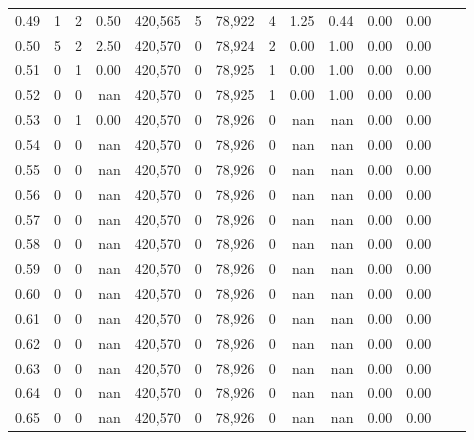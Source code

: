 \begin{tabular}{rrrrrrrrrrrrrr}
0.49 &       1 &      2 &    0.50 &  420,565 &        5 &  78,922 &       4 &  1.25 &  0.44 &  0.00 &      0.00 \\
0.50 &       5 &      2 &    2.50 &  420,570 &        0 &  78,924 &       2 &  0.00 &  1.00 &  0.00 &      0.00 \\
0.51 &       0 &      1 &    0.00 &  420,570 &        0 &  78,925 &       1 &  0.00 &  1.00 &  0.00 &      0.00 \\
0.52 &       0 &      0 &     nan &  420,570 &        0 &  78,925 &       1 &  0.00 &  1.00 &  0.00 &      0.00 \\
0.53 &       0 &      1 &    0.00 &  420,570 &        0 &  78,926 &       0 &   nan &   nan &  0.00 &      0.00 \\
0.54 &       0 &      0 &     nan &  420,570 &        0 &  78,926 &       0 &   nan &   nan &  0.00 &      0.00 \\
0.55 &       0 &      0 &     nan &  420,570 &        0 &  78,926 &       0 &   nan &   nan &  0.00 &      0.00 \\
0.56 &       0 &      0 &     nan &  420,570 &        0 &  78,926 &       0 &   nan &   nan &  0.00 &      0.00 \\
0.57 &       0 &      0 &     nan &  420,570 &        0 &  78,926 &       0 &   nan &   nan &  0.00 &      0.00 \\
0.58 &       0 &      0 &     nan &  420,570 &        0 &  78,926 &       0 &   nan &   nan &  0.00 &      0.00 \\
0.59 &       0 &      0 &     nan &  420,570 &        0 &  78,926 &       0 &   nan &   nan &  0.00 &      0.00 \\
0.60 &       0 &      0 &     nan &  420,570 &        0 &  78,926 &       0 &   nan &   nan &  0.00 &      0.00 \\
0.61 &       0 &      0 &     nan &  420,570 &        0 &  78,926 &       0 &   nan &   nan &  0.00 &      0.00 \\
0.62 &       0 &      0 &     nan &  420,570 &        0 &  78,926 &       0 &   nan &   nan &  0.00 &      0.00 \\
0.63 &       0 &      0 &     nan &  420,570 &        0 &  78,926 &       0 &   nan &   nan &  0.00 &      0.00 \\
0.64 &       0 &      0 &     nan &  420,570 &        0 &  78,926 &       0 &   nan &   nan &  0.00 &      0.00 \\
0.65 &       0 &      0 &     nan &  420,570 &        0 &  78,926 &       0 &   nan &   nan &  0.00 &      0.00 \\

\end{tabular}
